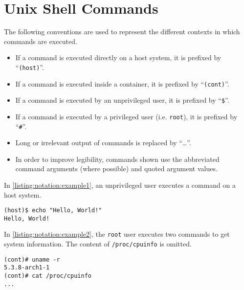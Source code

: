 \section{Unix Shell Commands}
The following conventions are used to represent the different contexts in which commands are executed.

\begin{itemize}
    \item If a command is executed directly on a host system, it is prefixed by ``\lstinline{(host)}''.
    \item If a command is executed inside a container, it is prefixed by ``\lstinline{(cont)}''.
    \item If a command is executed by an unprivileged user, it is prefixed by ``\lstinline{$}''.
    \item If a command is executed by a privileged user (i.e. \lstinline{root}), it is prefixed by ``\lstinline{#}''.
    \item Long or irrelevant output of commands is replaced by ``\ldots''.
    \item In order to improve legibility, commands shown use the abbreviated command arguments (where possible) and quoted argument values.
\end{itemize}

\medskip

In \autoref{listing:notation:example1}, an unprivileged user executes a command on a host system.
\begin{lstlisting}[caption={Shell command notation example 1.}, captionpos=b, label={listing:notation:example1}]
(host)$ echo "Hello, World!"
Hello, World!
\end{lstlisting}

\medskip

In \autoref{listing:notation:example2}, the \lstinline{root} user executes two commands to get system information. The content of \lstinline{/proc/cpuinfo} is omitted.
\begin{lstlisting}[caption={Shell command notation example 2.}, captionpos=b, label={listing:notation:example2}]
(cont)# uname -r
5.3.8-arch1-1
(cont)# cat /proc/cpuinfo
...
\end{lstlisting}
